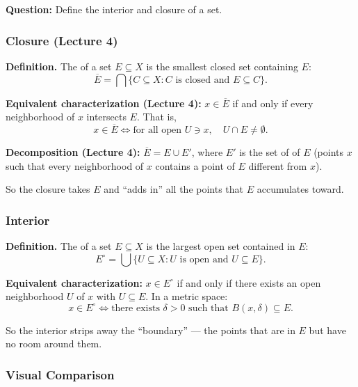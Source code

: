 \documentclass[../master/master.tex]{subfiles}
\begin{document}
\begin{summarybox}
\textbf{Question:} Define the interior and closure of a set.
\end{summarybox}

\subsubsection*{Closure (Lecture 4)}

\textbf{Definition.} The  of a set $E \subseteq X$ is the smallest closed set containing $E$:
\[
\overline{E} = \bigcap \{C \subseteq X : C \text{ is closed and } E \subseteq C\}.
\]

\textbf{Equivalent characterization (Lecture 4):} $x \in \overline{E}$ if and only if every neighborhood of $x$ intersects $E$. That is,
\[
x \in \overline{E} \iff \text{for all open } U \ni x, \quad U \cap E \neq \emptyset.
\]

\textbf{Decomposition (Lecture 4):} $\overline{E} = E \cup E'$, where $E'$ is the set of  of $E$ (points $x$ such that every neighborhood of $x$ contains a point of $E$ different from $x$).

So the closure takes $E$ and ``adds in'' all the points that $E$ accumulates toward.

\subsubsection*{Interior}

\textbf{Definition.} The  of a set $E \subseteq X$ is the largest open set contained in $E$:
\[
E^\circ = \bigcup \{U \subseteq X : U \text{ is open and } U \subseteq E\}.
\]

\textbf{Equivalent characterization:} $x \in E^\circ$ if and only if there exists an open neighborhood $U$ of $x$ with $U \subseteq E$. In a metric space:
\[
x \in E^\circ \iff \text{there exists } \delta > 0 \text{ such that } B(x, \delta) \subseteq E.
\]

So the interior strips away the ``boundary'' --- the points that are in $E$ but have no room around them.

\subsubsection*{Visual Comparison}
\end{document}
